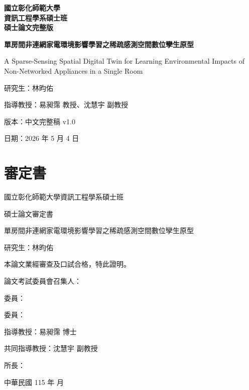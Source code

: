 \documentclass[12pt,a4paper]{article}
\begin{document}
\begin{center}
{\LARGE\bfseries 國立彰化師範大學\\[0.6em]資訊工程學系碩士班\\[0.6em]碩士論文完整版}
\end{center}

\begin{center}
{\Large\bfseries 單房間非連網家電環境影響學習之稀疏感測空間數位孿生原型}
\end{center}

\begin{center}A Sparse-Sensing Spatial Digital Twin for Learning Environmental Impacts of Non-Networked Appliances in a Single Room\end{center}

\begin{center}研究生：林昀佑\end{center}

\begin{center}指導教授：易昶霈 教授、沈慧宇 副教授\end{center}

\begin{center}版本：中文完整稿 v1.0\end{center}

\begin{center}日期：2026 年 5 月 4 日\end{center}

\clearpage

\section*{審定書}

國立彰化師範大學資訊工程學系碩士班


碩士論文審定書


單房間非連網家電環境影響學習之稀疏感測空間數位孿生原型


研究生：林昀佑


本論文業經審查及口試合格，特此證明。


論文考試委員會召集人：


委員：


委員：


指導教授：易昶霈 博士


共同指導教授：沈慧宇 副教授


所長：


中華民國 115 年 月


\clearpage
\end{document}
